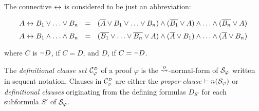 \begin{remark}
The connective $\leftrightarrow$ is considered to be just an abbreviation:
\begin{small}
$$
A \leftrightarrow B_1 \vee \ldots \vee B_n  \ \ =  \ \
(\overline{A} \vee B_1 \vee \ldots \vee B_n) \wedge 
(\overline{B_1} \vee A) \wedge \ldots \wedge 
(\overline{B_n} \vee A)
$$
$$
A \leftrightarrow B_1 \wedge \ldots \wedge B_n \ \ = \ \  
(\overline{B_1} \vee \ldots \vee \overline{B_n} \vee A ) \wedge 
(\overline{A} \vee B_1) \wedge \ldots \wedge 
(\overline{A} \vee B_n)
$$
\end{small}
where $\overline{C}$ is $\neg D$, if $C = D$, and $D$, if $C = \neg D$.
\end{remark}


\begin{definition}
\label{definition:ClauseSetDefinitional}
The \emph{definitional clause set} $\clausesetDefinitional{\varphi}$ of a 
proof $\varphi$ is the $\normalizePlusTimesD$-normal-form of $\mathcal{S}_{\varphi}$ 
written in sequent notation. Clauses in $\clausesetDefinitional{\varphi}$ are either the \emph{proper clause} $\vdash n(\mathcal{S}_{\varphi})$ or \emph{definitional clauses} originating from the defining formulas $D_{S'}$ for each subformula $S'$ of $\mathcal{S}_{\varphi}$.
\end{definition}


